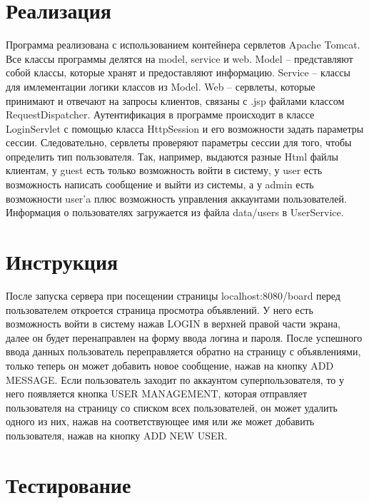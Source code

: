 \documentclass{article}
\begin{document}
    \section{Реализация}
    Программа реализована с использованием контейнера сервлетов Apache Tomcat.
    Все классы программы делятся на model, service и web. Model -- представляют собой классы, которые хранят и предоставляют информацию. Service -- классы для имлементации логики классов из Model. Web -- сервлеты, которые принимают и отвечают на запросы клиентов, связаны с .jsp файлами классом RequestDispatcher. 
    Аутентификация в программе происходит в классе LoginServlet с помощью класса HttpSession и его возможности задать параметры сессии. 
Следовательно, сервлеты проверяют параметры сессии для того, чтобы определить тип пользователя.  
	Так, например, выдаются разные Html файлы клиентам, у guest есть только возможность войти в систему, у user есть возможность написать сообщение и выйти из системы, а у admin есть возможности user'a плюс возможность управления аккаунтами пользователей.
	Информация о пользователях загружается из файла data/users в UserService. 
    \section{Инструкция}
    После запуска сервера при посещении страницы localhost:8080/board перед пользователем откроется страница просмотра объявлений. У него есть возможность войти в систему нажав LOGIN в верхней правой части экрана, далее он будет перенаправлен на форму ввода логина и пароля. После успешного ввода данных пользователь переправляется обратно на страницу с объявлениями, только теперь он может добавить новое сообщение, нажав на кнопку ADD MESSAGE. Если пользователь заходит по аккаунтом суперпользователя, то у него появляется кнопка USER MANAGEMENT, которая отправляет пользователя на страницу со списком всех пользователей, он может удалить одного из них, нажав на соответствующее имя или же может добавить пользователя, нажав на кнопку ADD NEW USER.
    \section{Тестирование}
\end{document}
